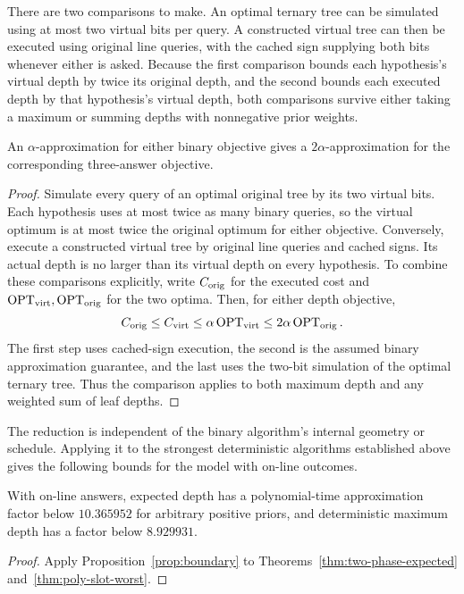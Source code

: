 There are two comparisons to make. An optimal ternary tree can be
simulated using at most two virtual bits per query. A constructed
virtual tree can then be executed using original line queries,
with the cached sign supplying both bits whenever either is asked.
Because the first comparison bounds each hypothesis's virtual depth
by twice its original depth, and the second bounds each executed depth
by that hypothesis's virtual depth, both comparisons survive either
taking a maximum or summing depths with nonnegative prior weights.
\begin{proposition}\label{prop:boundary}
An $\alpha$-approximation for either binary objective gives a
$2\alpha$-approximation for the corresponding three-answer objective.
\end{proposition}
\begin{proof}
Simulate every query of an optimal original tree by its two virtual
bits. Each hypothesis uses at most twice as many binary queries,
so the virtual optimum is at most twice the original optimum
for either objective. Conversely, execute a constructed virtual
tree by original line queries and cached signs. Its actual depth
is no larger than its virtual depth on every hypothesis.
To combine these comparisons explicitly, write $C_{\rm orig}$ for
the executed cost and $\operatorname{OPT}_{\rm virt},\operatorname{OPT}_{\rm orig}$ for the two
optima. Then, for either depth objective,
\[
 C_{\rm orig}\le C_{\rm virt}
 \le\alpha\operatorname{OPT}_{\rm virt}\le2\alpha\operatorname{OPT}_{\rm orig}.
\]
The first step uses cached-sign execution, the second is the assumed
binary approximation guarantee, and the last uses the two-bit
simulation of the optimal ternary tree. Thus the comparison applies
to both maximum depth and any weighted sum of leaf depths.
\end{proof}

The reduction is independent of the binary algorithm's internal
geometry or schedule. Applying it to the strongest deterministic
algorithms established above gives the following bounds for the
model with on-line outcomes.
\begin{corollary}
\label{cor:constant-boundaries}
With on-line answers, expected depth has a polynomial-time
approximation factor below $10.365952$ for arbitrary positive priors,
and deterministic maximum depth has a factor below $8.929931$.
\end{corollary}
\begin{proof}
Apply Proposition~\ref{prop:boundary} to
Theorems~\ref{thm:two-phase-expected} and~\ref{thm:poly-slot-worst}.
\end{proof}
